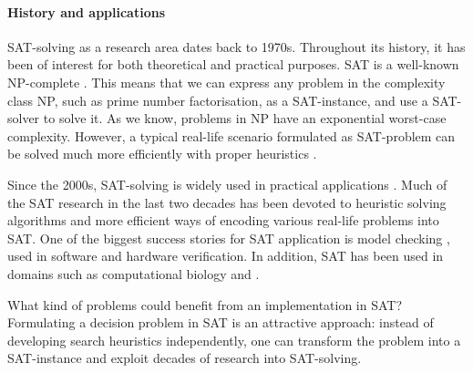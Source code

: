 \paragraph{History and applications}

SAT-solving as a research area dates back to 1970s. Throughout its history, it has been of interest for both theoretical and practical purposes. 
SAT is a well-known NP-complete \cite{cook1971complexity}. This means that we can express any problem in the complexity class NP, such as prime number factorisation, as a SAT-instance, and use a SAT-solver to solve it.
As we know, problems in NP have an exponential worst-case complexity. However, a typical real-life scenario formulated as SAT-problem can be solved much more efficiently with proper heuristics \cite{claessen2009satpractice}.


Since the 2000s, SAT-solving is widely used in practical applications \cite{marques_silva2010}. Much of the SAT research in the last two decades has been devoted to heuristic solving algorithms and more efficient ways of encoding various real-life problems into SAT.
One of the biggest success stories for SAT application is model checking , used in software and hardware verification. In addition, SAT has been used in domains such as computational biology  and .

What kind of problems could benefit from an implementation in SAT?
Formulating a decision problem in SAT is an attractive approach: instead of developing search heuristics independently, one can transform the problem into a SAT-instance and exploit decades of research into SAT-solving. 

